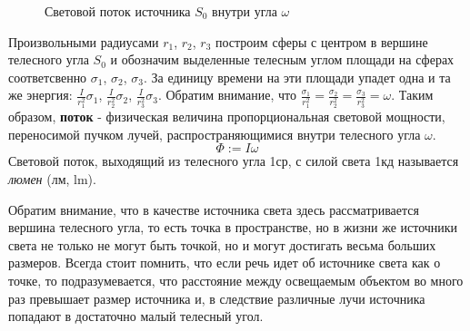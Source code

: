 \documentclass[12pt]{article}
\begin{document}
\begin{figure}[h]
\begin{center}
    \caption{Световой поток источника $S_0$ внутри угла $\omega$}
  \end{center}
\end{figure}

Произвольными радиусами $r_1$, $r_2$, $r_3$ построим сферы с центром в вершине
телесного угла $S_0$ и обозначим выделенные телесным углом площади на сферах соответсвенно
$\sigma_1$, $\sigma_2$, $\sigma_3$. За единицу времени на эти площади упадет одна и та
же энергия: $\frac{I}{r_1^2}\sigma_1$, $\frac{I}{r_2^2}\sigma_2$, $\frac{I}{r_3^2}\sigma_3$.
Обратим внимание, что $\frac{\sigma_1}{r_1^2}=\frac{\sigma_2}{r_2^2}=\frac{\sigma_3}{r_3^2}=\omega$.
Таким образом, \textbf{поток} - физическая величина пропорциональная световой мощности,
переносимой пучком лучей, распространяющимися внутри телесного угла $\omega$.
\[\Phi:=I\omega\]
Световой поток, выходящий из телесного угла 1ср, с силой света 1кд называется \textit{люмен} (лм, lm).

Обратим внимание, что в качестве источника света здесь рассматривается вершина телесного угла, то есть
точка в пространстве, но в жизни же источники света не только не могут быть точкой, но и могут
достигать весьма больших размеров. Всегда стоит помнить, что если речь идет об источнике света
как о точке, то подразумевается, что расстояние между освещаемым объектом во много раз
превышает размер источника и, в следствие различные лучи источника попадают в достаточно малый телесный угол.
\end{document}
